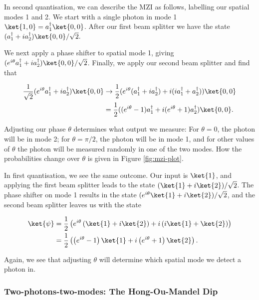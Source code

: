 In second quantisation, we can describe the MZI as follows, labelling our spatial modes 1 and 2. We start with a single photon in mode 1 $\ket{1,0} = a_1^\dagger\ket{0,0}$. After our first beam splitter we have the state $(a_1^\dagger + ia_2^\dagger)\ket{0,0}/\sqrt{2}.$

We next apply a phase shifter to spatial mode 1, giving $(e^{i\theta}a_1^\dagger + ia_2^\dagger)\ket{0,0}/\sqrt{2}$. Finally, we apply our second beam splitter and find that

\begin{align}
\frac{1}{\sqrt{2}}(e^{i\theta}a_1^\dagger + ia_2^\dagger)\ket{0,0} &\rightarrow \frac{1}{2}(e^{i\theta}(a_1^\dagger+ia_2^\dagger) + i(ia_1^\dagger + a_2^\dagger))\ket{0,0}\\
&= \frac{1}{2}((e^{i\theta}-1)a_1^\dagger+i(e^{i\theta}+1)a_2^\dagger)\ket{0,0}.
\end{align}

Adjusting our phase $\theta$ determines what output we measure: For $\theta=0$, the photon will be in mode 2; for $\theta=\pi/2$, the photon will be in mode 1, and for other values of $\theta$ the photon will be measured randomly in one of the two modes. How the probabilities change over $\theta$ is given in Figure \ref{fig:mzi-plot}.

In first quantisation, we see the same outcome. Our input is $\ket{1}$, and  applying the first beam splitter leads to the state $(\ket{1}+i\ket{2})/\sqrt{2}$. The phase shifter on mode 1 results in the state $(e^{i\theta}\ket{1}+i\ket{2})/\sqrt{2}$, and the second beam splitter leaves us with the state

\begin{align}
\ket{\psi} &= \frac{1}{2}\left(e^{i\theta}\left(\ket{1} + i\ket{2}\right) + i\left(i\ket{1} + \ket{2}\right)\right)\\
&= \frac{1}{2}\left(\left(e^{i\theta}-1\right)\ket{1} + i\left(e^{i\theta}+1\right)\ket{2}\right).
\end{align}

Again, we see that adjusting $\theta$ will determine which spatial mode we detect a photon in.

\subsubsection{Two-photons-two-modes: The Hong-Ou-Mandel Dip}


